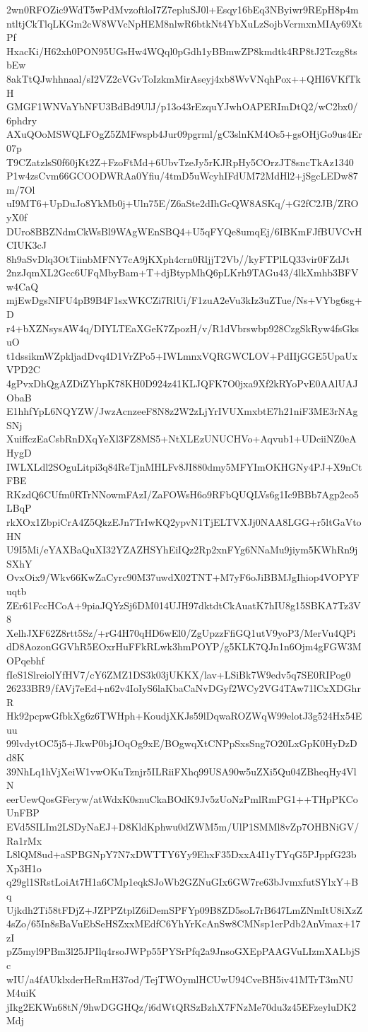 2wn0RFOZic9WdT5wPdMvzoftloI7Z7epluSJ0l+Esqy16bEq3NByiwr9REpH8p4m
ntltjCkTlqLKGm2cW8WVcNpHEM8nlwR6btkNt4YbXuLzSojbVcrmxnMIAy69XtPf
HxacKi/H62xh0PON95UGsHw4WQql0pGdh1yBBmwZP8kmdtk4RP8tJ2Tczg8tsbEw
8akTtQJwhhnaal/sI2VZ2cVGvToIzkmMirAseyj4xb8WvVNqhPox++QHI6VKfTkH
GMGF1WNVaYbNFU3BdBd9UlJ/p13o43rEzquYJwhOAPERImDtQ2/wC2bx0/6phdry
AXuQOoMSWQLFOgZ5ZMFwspb4Jur09pgrml/gC3slnKM4Os5+gsOHjGo9us4Er07p
T9CZatzlsS0f60jKt2Z+FzoFtMd+6UbvTzeJy5rKJRpHy5COrzJT8sncTkAz1340
P1w4zsCvm66GCOODWRAa0Yfiu/4tmD5uWcyhIFdUM72MdHl2+jSgcLEDw87m/7Ol
uI9MT6+UpDuJo8YkMb0j+Uln75E/Z6aSte2dIhGcQW8ASKq/+G2fC2JB/ZROyX0f
DUro8BBZNdmCkWsBl9WAgWEnSBQ4+U5qFYQe8umqEj/6IBKmFJfBUVCvHCIUK3cJ
8h9aSvDlq3OtTiinbMFNY7cA9jKXph4crn0RljjT2Vb//kyFTPlLQ33vir0FZdJt
2nzJqmXL2Gcc6UFqMbyBam+T+djBtypMhQ6pLKrh9TAGu43/4lkXmhb3BFVw4CaQ
mjEwDgsNIFU4pB9B4F1sxWKCZi7RlUi/F1zuA2eVu3kIz3uZTue/Ns+VYbg6sg+D
r4+bXZNsysAW4q/DIYLTEaXGeK7ZpozH/v/R1dVbrswbp928CzgSkRyw4fsGksuO
t1dssikmWZpkljadDvq4D1VrZPo5+IWLmnxVQRGWCLOV+PdIIjGGE5UpaUxVPD2C
4gPvxDhQgAZDiZYhpK78KH0D924z41KLJQFK7O0jxa9Xf2kRYoPvE0AAlUAJObaB
E1hhfYpL6NQYZW/JwzAcnzeeF8N8z2W2zLjYrIVUXmxbtE7h21niF3ME3rNAgSNj
XuiffczEaCsbRnDXqYeXl3FZ8MS5+NtXLEzUNUCHVo+Aqvub1+UDciiNZ0eAHygD
IWLXLdl2SOguLitpi3q84ReTjnMHLFv8JI880dmy5MFYImOKHGNy4PJ+X9nCtFBE
RKzdQ6CUfm0RTrNNowmFAzI/ZaFOWsH6o9RFbQUQLVs6g1Ic9BBb7Agp2eo5LBqP
rkXOx1ZbpiCrA4Z5QkzEJn7TrIwKQ2ypvN1TjELTVXJj0NAA8LGG+r5ltGaVtoHN
U9I5Mi/eYAXBaQuXI32YZAZHSYhEiIQz2Rp2xnFYg6NNaMu9jiym5KWhRn9jSXhY
OvxOix9/Wkv66KwZaCyrc90M37uwdX02TNT+M7yF6oJiBBMJgIhiop4VOPYFuqtb
ZEr61FccHCoA+9piaJQYzSj6DM014UJH97dktdtCkAuatK7hIU8g15SBKA7Tz3V8
XelhJXF62Z8rtt5Sz/+rG4H70qHD6wEl0/ZgUpzzFfiGQ1utV9yoP3/MerVu4QPi
dD8AozonGGVhR5EOxrHuFFkRLwk3hmPOYP/g5KLK7QJn1n6Ojm4gFGW3MOPqebhf
fIeS1SlreiolYfHV7/cY6ZMZ1DS3k03jUKKX/lav+LSiBk7W9edv5q7SE0RIPog0
26233BR9/fAVj7eEd+n62v4IoIyS6laKbaCaNvDGyf2WCy2VG4TAw71lCxXDGhrR
Hk92pcpwGfbkXg6z6TWHph+KoudjXKJs59lDqwaROZWqW99elotJ3g524Hx54Euu
99lvdytOC5j5+JkwP0bjJOqOg9xE/BOgwqXtCNPpSxsSng7O20LxGpK0HyDzDd8K
39NhLq1hVjXeiW1vwOKuTznjr5ILRiiFXhq99USA90w5uZXi5Qu04ZBheqHy4VlN
eerUewQosGFeryw/atWdxK0snuCkaBOdK9Jv5zUoNzPmlRmPG1++THpPKCoUnFBP
EVd5SILIm2LSDyNaEJ+D8KldKphwu0dZWM5m/UlP1SMMl8vZp7OHBNiGV/Ra1rMx
L8lQM8ud+aSPBGNpY7N7xDWTTY6Yy9EhxF35DxxA4I1yTYqG5PJppfG23bXp3H1o
q29gl1SRstLoiAt7H1a6CMp1eqkSJoWb2GZNuGIx6GW7re63bJvmxfutSYlxY+Bq
Ujkdh2Ti58tFDjZ+JZPPZtplZ6iDemSPFYp09B8ZD5soL7rB647LmZNmItU8iXzZ
4sZo/65In8sBaVuEbSeHSZxxMEdfC6YhYrKcAnSw8CMNsp1erPdb2AnVmax+17zI
pZ5myl9PBm3l25JPIlq4rsoJWPp55PYSrPfq2a9JnsoGXEpPAAGVuLIzmXALbjSc
wIU/a4fAUklxderHeRmH37od/TejTWOymlHCUwU94CveBH5iv41MTrT3mNUM4uiK
jIkg2EKWn68tN/9hwDGGHQz/i6dWtQRSzBzhX7FNzMe70du3z45EFzeyluDK2Mdj
